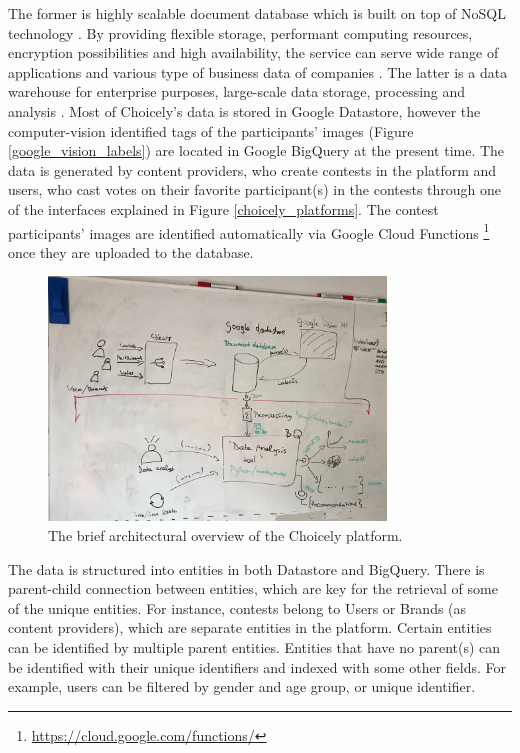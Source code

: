     The former is highly scalable document database which is built on top of NoSQL technology \cite{google-datastore-overview}. By providing flexible storage, performant computing resources, encryption possibilities and high availability, the service can serve wide range of applications and various type of business data of companies \cite{google-datastore-overview}. The latter is a data warehouse for enterprise purposes, large-scale data storage, processing and analysis \cite{google-bigquery-overview}. Most of Choicely's data is stored in Google Datastore, however the computer-vision identified tags of the participants' images (Figure \ref{google_vision_labels}) are located in Google BigQuery at the present time. The data is generated by content providers, who create contests in the platform and users, who cast votes on their favorite participant(s) in the contests through one of the interfaces explained in Figure \ref{choicely_platforms}. The contest participants' images are identified automatically via Google Cloud Functions \footnote{\url{https://cloud.google.com/functions/}} once they are uploaded to the database.

    \begin{figure}[h] 
		\begin{center}
            \includegraphics[width=0.8\textwidth]{Images/architecture_whiteboard.jpg}
			\caption{The brief architectural overview of the Choicely platform.}
			\label{choicely_architecture}
		\end{center}
    \end{figure}

    The data is structured into entities in both Datastore and BigQuery. There is parent-child connection between entities, which are key for the retrieval of some of the unique entities. For instance, contests belong to Users or Brands (as content providers), which are separate entities in the platform. Certain entities can be identified by multiple parent entities. Entities that have no parent(s) can be identified with their unique identifiers and indexed with some other fields. For example, users can be filtered by gender and age group, or unique identifier. 


